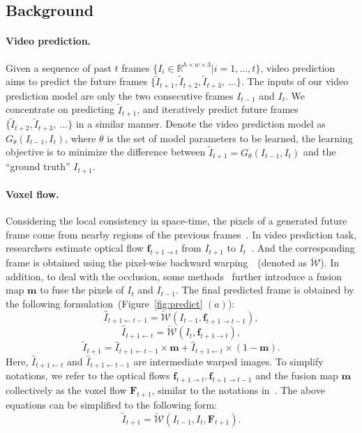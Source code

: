 \documentclass[10pt,twocolumn,letterpaper]{article}
\newcommand{\backwardwarp}{\overleftarrow{\mathcal{W}}}
\begin{document}
\subsection{Background}
\label{sec:background}

\paragraph{Video prediction.}
Given a sequence of past $t$ frames $\{I_{i}\in \mathbb{R}^{h\times w\times 3}|i=1,...,t\}$, video prediction aims to predict the future frames $\{\tilde{I}_{t+1}, \tilde{I}_{t+2}, \tilde{I}_{t+3} ,\ ...\}$. The inputs of our video prediction model are only the two consecutive frames $I_{t-1}$ and $I_t$. We concentrate on predicting $\tilde{I}_{t+1}$, and iteratively predict future frames $\{\tilde{I}_{t+2}, \tilde{I}_{t+3} ,\ ...\}$ in a similar manner. Denote the video prediction model as $G_{\theta}(I_{t-1},I_{t})$, where $\theta$ is the set of model parameters to be learned, the learning objective is to minimize the difference between $\tilde{I}_{t+1}=G_{\theta}(I_{t-1},I_{t})$ and the ``ground truth'' $I_{t+1}$.

\paragraph{Voxel flow.} Considering the local consistency in space-time, the pixels of a generated future frame come from nearby regions of the previous frames~\cite{zhou2016view,vimeo}. In video prediction task, researchers estimate optical flow $\textbf{f}_{t+1 \rightarrow t}$ from $I_{t+1}$ to $I_t$~\cite{dvf}. And the corresponding frame is obtained using the pixel-wise backward warping~\cite{backwarp}~(denoted as $\backwardwarp$). In addition, to deal with the occlusion, some methods~\cite{superslomo,dvf} further introduce a fusion map $\textbf{m}$ to fuse the pixels of $I_{t}$ and $I_{t-1}$. The final predicted frame is obtained by the following formulation~(Figure~\ref{fig:predict} $(a)$):
\begin{equation}
\hat{I}_{t+1\leftarrow{t-1}} = \backwardwarp( I_{t-1},   \textbf{f}_{ t+1 \rightarrow t-1} ),
\end{equation}
\begin{equation}
     \hat{I}_{t+1 \leftarrow{t}} = \backwardwarp( I_t,  \textbf{f}_{t+1 \rightarrow t} ),
\end{equation}
\begin{equation}
     \tilde{I}_{t+1} = \hat{I}_{t+1\leftarrow{t-1}} \times \textbf{m} + \hat{I}_{t+1\leftarrow{t}} \times (1-\textbf{m}).
\end{equation}
Here, $\hat{I}_{t+1 \leftarrow{t}}$ and $\hat{I}_{t+1 \leftarrow{t-1}}$ are intermediate warped images. To simplify notations, we refer to the optical flows $\textbf{f}_{t+1 \rightarrow t},\textbf{f}_{t+1 \rightarrow t-1}$ and the fusion map $\textbf{m}$ collectively as the voxel flow $\textbf{F}_{t+1}$, similar to the notations in~\cite{dvf}. The above equations can be simplified to the following form:
\begin{equation}
     \tilde{I}_{t+1} = \backwardwarp( I_{t-1}, I_t,  \textbf{F}_{t+1} ).
\end{equation}
\end{document}
